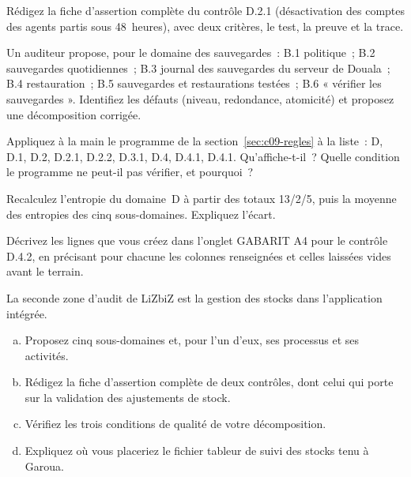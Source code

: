 \begin{boxexo}[title={\ding{45}\quad Exercice~9.4. Une fiche complète \niveaumoyen}]
Rédigez la fiche d'assertion complète du contrôle D.2.1 (désactivation des
comptes des agents partis sous 48~heures), avec deux critères, le test, la
preuve et la trace.
\end{boxexo}

\begin{boxexo}[title={\ding{45}\quad Exercice~9.5. Diagnostiquer une décomposition \niveaumoyen}]
Un auditeur propose, pour le domaine des sauvegardes~: B.1 politique~; B.2
sauvegardes quotidiennes~; B.3 journal des sauvegardes du serveur de
Douala~; B.4 restauration~; B.5 sauvegardes et restaurations testées~; B.6
« vérifier les sauvegardes ». Identifiez les défauts (niveau, redondance,
atomicité) et proposez une décomposition corrigée.
\end{boxexo}

\begin{boxexo}[title={\ding{45}\quad Exercice~9.6. Le programme de contrôle \niveaumoyen}]
Appliquez à la main le programme de la section~\ref{sec:c09-regles} à la
liste~: D, D.1, D.2, D.2.1, D.2.2, D.3.1, D.4, D.4.1, D.4.1. Qu'affiche-t-il~?
Quelle condition le programme ne peut-il pas vérifier, et pourquoi~?
\end{boxexo}

\begin{boxexo}[title={\ding{45}\quad Exercice~9.7. L'agrégation \niveaumoyen}]
Recalculez l'entropie du domaine~D à partir des totaux 13/2/5, puis la
moyenne des entropies des cinq sous-domaines. Expliquez l'écart.
\end{boxexo}

\begin{boxexo}[title={\ding{45}\quad Exercice~9.8. Construire dans O4 \niveaumoyen}]
Décrivez les lignes que vous créez dans l'onglet GABARIT A4 pour le
contrôle D.4.2, en précisant pour chacune les colonnes renseignées et
celles laissées vides avant le terrain.
\end{boxexo}

\begin{boxexo}[title={\ding{45}\quad Exercice~9.9. Décomposer le domaine des stocks \niveauexpert}]
La seconde zone d'audit de LiZbiZ est la gestion des stocks dans
l'application intégrée.
\begin{enumerate}[(a)]
    \item Proposez cinq sous-domaines et, pour l'un d'eux, ses processus et
          ses activités.
    \item Rédigez la fiche d'assertion complète de deux contrôles, dont celui
          qui porte sur la validation des ajustements de stock.
    \item Vérifiez les trois conditions de qualité de votre décomposition.
    \item Expliquez où vous placeriez le fichier tableur de suivi des stocks
          tenu à Garoua.
\end{enumerate}
\end{boxexo}

